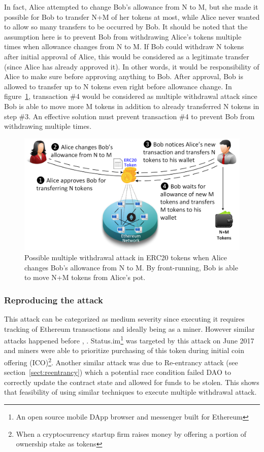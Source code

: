 In fact, Alice attempted to change Bob’s allowance from N to M, but she made it possible for Bob to transfer N+M of her tokens at most, while Alice never wanted to allow so many transfers to be occurred by Bob. It should be noted that the assumption here is to prevent Bob from withdrawing Alice’s tokens multiple times when allowance changes from N to M. If Bob could withdraw N tokens after initial approval of Alice, this would be considered as a legitimate transfer (since Alice has already approved it). In other words, it would be responsibility of Alice to make sure before approving anything to Bob. After approval, Bob is allowed to transfer up to N tokens even right before allowance change. In figure~\ref{fig:mwaseq}, transaction \#4 would be considered as multiple withdrawal attack since Bob is able to move more M tokens in addition to already transferred N tokens in step \#3. An effective solution must prevent transaction \#4 to prevent Bob from withdrawing multiple times.

\begin{figure}[t]
	\centering
	\includegraphics[width=0.8\linewidth]{figures/img13.png}
	\caption{Possible multiple withdrawal attack in ERC20 tokens when Alice changes Bob's allowance from N to M. By front-running, Bob is able to move N+M tokens from Alice's pot.}
	\label{fig:mwaseq}
\end{figure}

\subsubsection{Reproducing the attack}
This attack can be categorized as medium severity since executing it requires tracking of Ethereum transactions and ideally being as a miner. However similar attacks happened before \cite{eskandari2019sok}, \cite{ERC20MWA}. Status.im\footnote{An open source mobile DApp browser and messenger built for Ethereum} was targeted by this attack on June 2017 and miners were able to prioritize purchasing of this token during initial coin offering (ICO)\footnote{When a cryptocurrency startup firm raises money by offering a portion of ownership stake as tokens}. Another similar attack was due to Re-entrancy attack (see section~\ref{sect:reentrancy}) which a potential race condition failed DAO to correctly update the contract state and allowed for funds to be stolen. This shows that feasibility of using similar techniques to execute multiple withdrawal attack.

